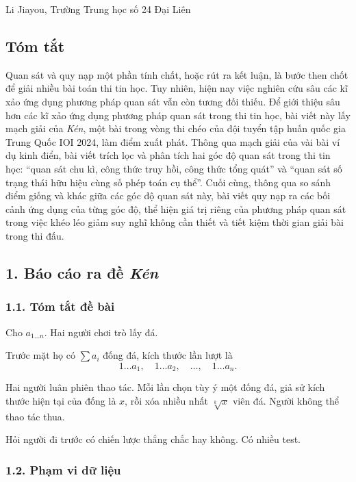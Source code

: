 \documentclass[11pt]{article}
\begin{document}
\begin{center}
Li Jiayou, Trường Trung học số 24 Đại Liên
\end{center}

\subsection*{Tóm tắt}

Quan sát và quy nạp một phần tính chất, hoặc rút ra kết luận, là bước then
chốt để giải nhiều bài toán thi tin học. Tuy nhiên, hiện nay việc nghiên cứu
sâu các kĩ xảo ứng dụng phương pháp quan sát vẫn còn tương đối thiếu. Để giới
thiệu sâu hơn các kĩ xảo ứng dụng phương pháp quan sát trong thi tin học, bài
viết này lấy mạch giải của \emph{Kén}, một bài trong vòng thi chéo của đội
tuyển tập huấn quốc gia Trung Quốc IOI 2024, làm điểm xuất phát. Thông qua
mạch giải của vài bài ví dụ kinh điển, bài viết trích lọc và phân tích hai góc
độ quan sát trong thi tin học: ``quan sát chu kì, công thức truy hồi, công thức
tổng quát'' và ``quan sát số trạng thái hữu hiệu cùng số phép toán cụ thể''.
Cuối cùng, thông qua so sánh điểm giống và khác giữa các góc độ quan sát này,
bài viết quy nạp ra các bối cảnh ứng dụng của từng góc độ, thể hiện giá trị
riêng của phương pháp quan sát trong việc khéo léo giảm suy nghĩ không cần
thiết và tiết kiệm thời gian giải bài trong thi đấu.

\subsection*{1. Báo cáo ra đề \emph{Kén}}

\subsubsection*{1.1. Tóm tắt đề bài}

Cho \(a_{1\ldots n}\). Hai người chơi trò lấy đá.

Trước mặt họ có \(\sum a_i\) đống đá, kích thước lần lượt là
\[
  1\ldots a_1,\quad 1\ldots a_2,\quad \ldots,\quad 1\ldots a_n.
\]

Hai người luân phiên thao tác. Mỗi lần chọn tùy ý một đống đá, giả sử kích
thước hiện tại của đống là \(x\), rồi xóa nhiều nhất \(\sqrt[k]{x}\) viên đá.
Người không thể thao tác thua.

Hỏi người đi trước có chiến lược thắng chắc hay không. Có nhiều test.

\subsubsection*{1.2. Phạm vi dữ liệu}
\end{document}
